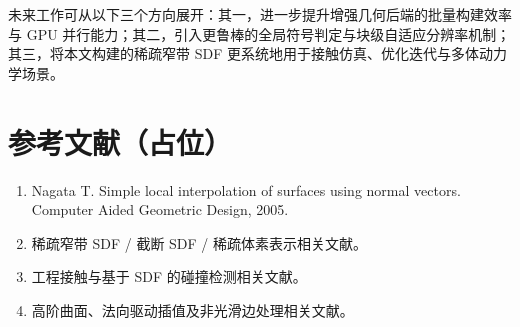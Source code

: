 \documentclass[11pt,a4paper]{ctexart}
\begin{document}
未来工作可从以下三个方向展开：其一，进一步提升增强几何后端的批量构建效率与 GPU 并行能力；其二，引入更鲁棒的全局符号判定与块级自适应分辨率机制；其三，将本文构建的稀疏窄带 SDF 更系统地用于接触仿真、优化迭代与多体动力学场景。

\section*{参考文献（占位）}

\begin{enumerate}[leftmargin=2em]
    \item Nagata T. Simple local interpolation of surfaces using normal vectors. Computer Aided Geometric Design, 2005.
    \item [待补充] 稀疏窄带 SDF / 截断 SDF / 稀疏体素表示相关文献。
    \item [待补充] 工程接触与基于 SDF 的碰撞检测相关文献。
    \item [待补充] 高阶曲面、法向驱动插值及非光滑边处理相关文献。
\end{enumerate}
\end{document}
